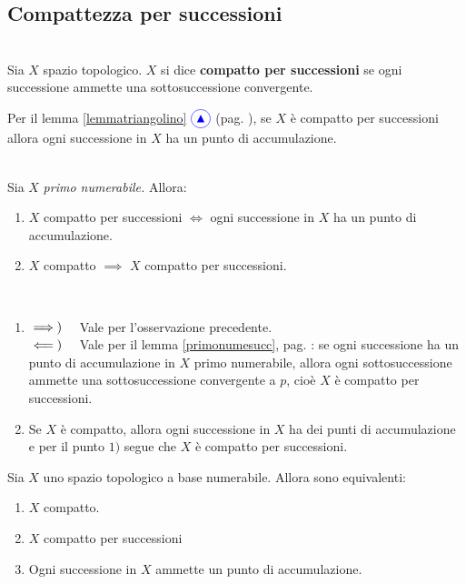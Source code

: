 \subsection{Compattezza per successioni}
\begin{define}~{}\\
Sia $X$ spazio topologico. $X$ si dice \textbf{compatto per successioni} se ogni successione ammette una sottosuccessione convergente.
\end{define}
\begin{observe}
Per il lemma \ref{lemmatriangolino} $\textcolor{blue}{\circled{{\large \blacktriangle}}}$ (pag. \pageref{lemmatriangolino}), se $X$ è compatto per successioni allora ogni successione in $X$ ha un punto di accumulazione.
\end{observe}
\begin{lemming}~{}\\
	Sia $X$ \textit{primo numerabile.} Allora:
\begin{enumerate}
	\item $X$ compatto per successioni $\iff $ ogni successione in $X$ ha un punto di accumulazione.
	\item $X$ compatto $\implies$ $X$ compatto per successioni.
\end{enumerate}
\vspace{-3mm}
\end{lemming}
\begin{demonstration}~{}
\begin{enumerate}[label=\Roman*]
\item $\implies)\quad$ Vale per l'osservazione precedente.\\
$\impliedby)\quad$ Vale per il lemma \ref{primonumesucc}, pag. \pageref{primonumesucc}: se ogni successione ha un punto di accumulazione in $X$ primo numerabile, allora ogni sottosuccessione ammette una sottosuccessione convergente a $p$, cioè $X$ è compatto per successioni.
\item Se $X$ è compatto, allora ogni successione in $X$ ha dei punti di accumulazione e per il punto $1)$ segue che $X$ è compatto per successioni.
\end{enumerate}
\vspace{-3mm}
\end{demonstration}
\begin{proposition}
	Sia $X$ uno spazio topologico a base numerabile. Allora sono equivalenti:
	\begin{enumerate}
		\item $X$ compatto.
		\item $X$ compatto per successioni
		\item Ogni successione in $X$ ammette un punto di accumulazione.
	\end{enumerate}
\vspace{-3mm}
\end{proposition}
